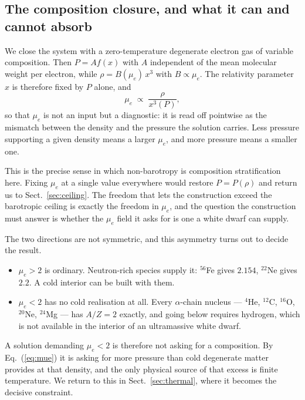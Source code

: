 \documentclass{aa}
\begin{document}
\subsection{The composition closure, and what it can and cannot absorb}
\label{sec:closure}

We close the system with a zero-temperature degenerate electron gas of
variable composition. Then $P = A f(x)$ with $A$ independent of the mean
molecular weight per electron, while $\rho = B(\mu_e)\,x^3$ with
$B \propto \mu_e$. The relativity parameter $x$ is therefore fixed by
$P$ alone, and
\begin{equation}
\mu_e \;\propto\; \frac{\rho}{x^3(P)} ,
\label{eq:mue}
\end{equation}
so that $\mu_e$ is not an input but a diagnostic: it is read off
pointwise as the mismatch between the density and the pressure the
solution carries. Less pressure supporting a given density means a larger
$\mu_e$, and more pressure means a smaller one.

This is the precise sense in which non-barotropy is composition
stratification here. Fixing $\mu_e$ at a single value everywhere would
restore $P = P(\rho)$ and return us to Sect.~\ref{sec:ceiling}. The
freedom that lets the construction exceed the barotropic ceiling is
exactly the freedom in $\mu_e$, and the question the construction must
answer is whether the $\mu_e$ field it asks for is one a white dwarf can
supply.

The two directions are not symmetric, and this asymmetry turns out to
decide the result.
\begin{itemize}
\item $\mu_e > 2$ is ordinary. Neutron-rich species supply it:
      $^{56}$Fe gives $2.154$, $^{22}$Ne gives $2.2$. A cold interior can
      be built with them.
\item $\mu_e < 2$ has no cold realisation at all. Every $\alpha$-chain
      nucleus --- $^{4}$He, $^{12}$C, $^{16}$O, $^{20}$Ne, $^{24}$Mg ---
      has $A/Z = 2$ exactly, and going below requires hydrogen, which is
      not available in the interior of an ultramassive white dwarf.
\end{itemize}
A solution demanding $\mu_e < 2$ is therefore not asking for a
composition. By Eq.~(\ref{eq:mue}) it is asking for more pressure than
cold degenerate matter provides at that density, and the only physical
source of that excess is finite temperature. We return to this in
Sect.~\ref{sec:thermal}, where it becomes the decisive constraint.
\end{document}
